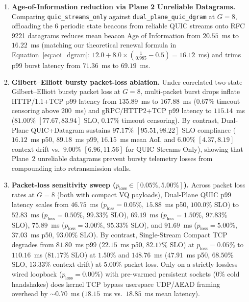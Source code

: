 \documentclass[11pt]{article}
\begin{document}
\begin{enumerate}
\begin{itemize}
    \item \emph{Dual-Plane QUIC + Compact VQ:} $97.83\%$ $[96.33, 98.73]$ SLO compliance ($+34.83$~pp combined gain), $16.53$~ms p50, $69.19$~ms p99 latency ($-66.70$~ms).
  \end{itemize}
  Thus, transport-layer HoL elimination accounts for $61.5\%$ of the standalone SLO improvement and $61.5\%$ of the standalone p99 tail-latency reduction.
  \item \textbf{Age-of-Information reduction via Plane 2 Unreliable Datagrams.} Comparing \texttt{quic\_\linebreak[0]streams\_\linebreak[0]only} against \texttt{dual\_\linebreak[0]plane\_\linebreak[0]quic\_\linebreak[0]dgram} at $G=8$, offloading the $6$ periodic state beacons from reliable QUIC streams onto RFC 9221 datagrams reduces mean beacon Age of Information from $20.55$~ms to $16.22$~ms (matching our theoretical renewal formula in Equation~\ref{eq:aoi_dgram}: $12.0 + 8.0 \times (\frac{1}{0.985} - 0.5) = 16.12$~ms) and trims p99 burst latency from $71.36$~ms to $69.19$~ms.
  \item \textbf{Gilbert--Elliott bursty packet-loss ablation.} Under correlated two-state Gilbert--Elliott bursty packet loss at $G=8$, multi-packet burst drops inflate HTTP/1.1+TCP p99 latency from $135.89$~ms to $167.88$~ms ($0.67\%$ timeout censoring above $200$~ms) and gRPC/HTTP2+TCP p99 latency to $115.14$~ms ($81.00\%$ $[77.67, 83.94]$ SLO, $0.17\%$ timeout censoring). By contrast, Dual-Plane QUIC+Datagram sustains $97.17\%$ $[95.51, 98.22]$ SLO compliance ($16.12$~ms p50, $89.18$~ms p99, $16.15$~ms mean AoI, and $6.00\%$ $[4.37, 8.19]$ context drift vs.\ $9.00\%$ $[6.96, 11.56]$ for QUIC Streams Only), showing that Plane~2 unreliable datagrams prevent bursty telemetry losses from compounding into retransmission stalls.
  \item \textbf{Packet-loss sensitivity sweep ($p_{\mathrm{loss}} \allowbreak \in [0.05\%,\allowbreak 5.00\%]$).} Across packet loss rates at $G=8$ (both with compact VQ payloads), Dual-Plane QUIC p99 latency scales from $46.75$~ms ($p_{\mathrm{loss}} = 0.05\%$, $15.88$~ms p50, $100.0\%$ SLO) to $52.83$~ms ($p_{\mathrm{loss}} = 0.50\%$, $99.33\%$ SLO), $69.19$~ms ($p_{\mathrm{loss}} = 1.50\%$, $97.83\%$ SLO), $75.89$~ms ($p_{\mathrm{loss}} = 3.00\%$, $95.33\%$ SLO), and $91.69$~ms ($p_{\mathrm{loss}} = 5.00\%$, $37.03$~ms p50, $93.00\%$ SLO). By contrast, Single-Stream Compact TCP degrades from $81.80$~ms p99 ($22.15$~ms p50, $82.17\%$ SLO) at $p_{\mathrm{loss}} = 0.05\%$ to $110.16$~ms ($81.17\%$ SLO) at $1.50\%$ and $148.76$~ms ($47.91$~ms p50, $68.50\%$ SLO, $13.33\%$ context drift) at $5.00\%$ packet loss. Only on a strictly lossless wired loopback ($p_{\mathrm{loss}} = 0.00\%$) with pre-warmed persistent sockets ($0\%$ cold handshakes) does kernel TCP bypass userspace UDP/AEAD framing overhead by $\sim 0.70$~ms ($18.15$~ms vs.\ $18.85$~ms mean latency).
\end{enumerate}
\end{document}
